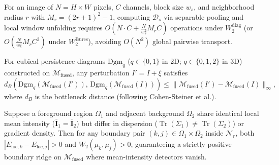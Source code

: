 \begin{theorem}
For an image of $N = H \times W$ pixels, $C$ channels, block size $w_s$, and neighborhood radius $r$ with $M_r = (2r+1)^2 - 1$, computing $\mathcal{D}_s$ via separable pooling and local window unfolding requires $O(N \cdot C + \frac{N}{w_s^2} M_r C)$ operations under $W_2^{\mathrm{diag}}$ (or $O(\frac{N}{w_s^2} M_r C^3)$ under $W_2^{\mathrm{Bures}}$), avoiding $O(N^2)$ global pairwise transport.
\end{theorem}

\begin{theorem}
For cubical persistence diagrams $\mathrm{Dgm}_q$ ($q \in \{0,1\}$ in 2D; $q \in \{0,1,2\}$ in 3D) constructed on $\mathcal{M}_{\mathrm{fused}}$, any perturbation $I' = I + \xi$ satisfies
\[
d_B\!\left(\mathrm{Dgm}_q(\mathcal{M}_{\mathrm{fused}}(I')),\, \mathrm{Dgm}_q(\mathcal{M}_{\mathrm{fused}}(I))\right) \le \lVert \mathcal{M}_{\mathrm{fused}}(I') - \mathcal{M}_{\mathrm{fused}}(I)\rVert_\infty,
\]
where $d_B$ is the bottleneck distance (following Cohen-Steiner et al.).
\end{theorem}

\begin{theorem}
Suppose a foreground region $\Omega_1$ and adjacent background $\Omega_2$ share identical local mean intensity ($\bar{\mathbf{I}}_1 = \bar{\mathbf{I}}_2$) but differ in dispersion ($\operatorname{Tr}(\Sigma_1) \neq \operatorname{Tr}(\Sigma_2)$) or gradient density. Then for any boundary pair $(k,j) \in \Omega_1 \times \Omega_2$ inside $\mathcal{N}_r$, both $|E_{\mathrm{loc},k} - E_{\mathrm{loc},j}| > 0$ and $W_2(\mu_k, \mu_j) > 0$, guaranteeing a strictly positive boundary ridge on $\mathcal{M}_{\mathrm{fused}}$ where mean-intensity detectors vanish.
\end{theorem}
